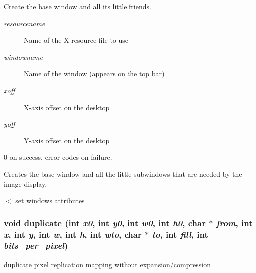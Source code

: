 Create the base window and all its little friends. 

\begin{Desc}
\item[Parameters:]
\begin{description}
\item[{\em resourcename}]Name of the X-resource file to use \item[{\em windowname}]Name of the window (appears on the top bar) \item[{\em xoff}]X-axis offset on the desktop \item[{\em yoff}]Y-axis offset on the desktop\end{description}
\end{Desc}
\begin{Desc}
\item[Returns:]0 on success, error codes on failure.\end{Desc}
Creates the base window and all the little subwindows that are needed by the image display.

$<$ set windows attributes 
\subsubsection{\setlength{\rightskip}{0pt plus 5cm}void duplicate (int {\em x0}, int {\em y0}, int {\em w0}, int {\em h0}, char $\ast$ {\em from}, int {\em x}, int {\em y}, int {\em w}, int {\em h}, int {\em wto}, char $\ast$ {\em to}, int {\em fill}, int {\em bits\_\-per\_\-pixel})}\label{xtvutils_8c_a227}


duplicate pixel replication mapping without expansion/compression 

